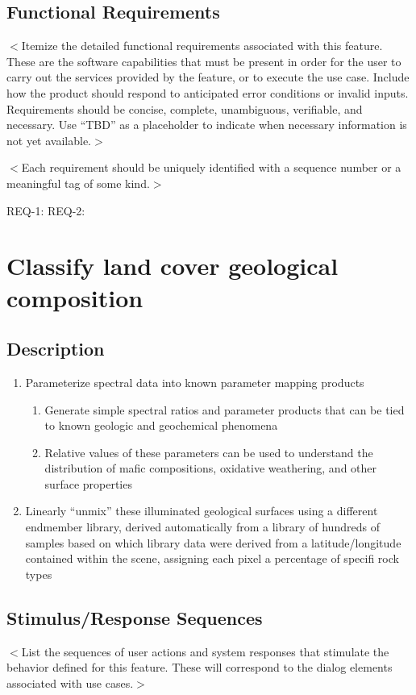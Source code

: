 \documentclass{scrreprt}
\begin{document}
\subsection{Functional Requirements}
$<$Itemize the detailed functional requirements associated with this feature.  
These are the software capabilities that must be present in order for the user 
to carry out the services provided by the feature, or to execute the use case.  
Include how the product should respond to anticipated error conditions or 
invalid inputs. Requirements should be concise, complete, unambiguous, 
verifiable, and necessary. Use “TBD” as a placeholder to indicate when necessary 
information is not yet available.$>$

$<$Each requirement should be uniquely identified with a sequence number or a 
meaningful tag of some kind.$>$

REQ-1:  REQ-2:

\section{Classify land cover geological composition}
\subsection{Description}
\begin{enumerate}
	\item Parameterize spectral data into known parameter mapping products
		
     		\begin{enumerate}
		\item Generate simple spectral ratios and parameter products that 
			can be tied to known geologic and geochemical phenomena
		\item Relative values of these parameters can be used to understand the 
			distribution of mafic compositions, oxidative weathering, and other 
				surface properties
		\end{enumerate}
	\item Linearly ``unmix'' these illuminated geological surfaces using a 
		different endmember library, derived automatically from a library 
		of hundreds of samples based on which library data were derived from 
		a latitude/longitude contained within the scene, assigning each pixel
		a percentage of specifi rock types
\end{enumerate}

\subsection{Stimulus/Response Sequences}
$<$List the sequences of user actions and system responses that stimulate the 
behavior defined for this feature. These will correspond to the dialog elements 
associated with use cases.$>$
\end{document}

